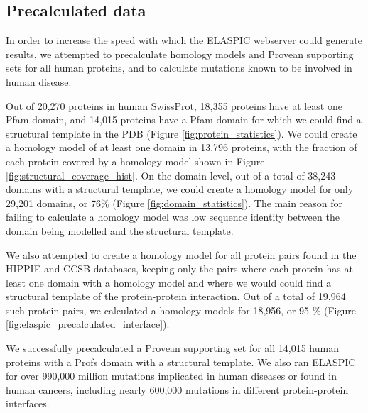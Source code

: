 \clearpage
\subsection{Precalculated data}

In order to increase the speed with which the ELASPIC webserver could generate results, we attempted to precalculate homology models and Provean supporting sets for all human proteins, and to calculate mutations known to be involved in human disease.

Out of 20,270 proteins in human SwissProt, 18,355 proteins have at least one Pfam domain, and 14,015 proteins have a Pfam domain for which we could find a structural template in the PDB (Figure \ref{fig:protein_statistics}). We could create a homology model of at least one domain in 13,796 proteins, with the fraction of each protein covered by a homology model shown in Figure \ref{fig:structural_coverage_hist}. On the domain level, out of a total of 38,243 domains with a structural template, we could create a homology model for only 29,201 domains, or 76\% (Figure \ref{fig:domain_statistics}). The main reason for failing to calculate a homology model was low sequence identity between the domain being modelled and the structural template.

We also attempted to create a homology model for all protein pairs found in the HIPPIE \cite{schaefer_hippie:_2012} and CCSB \cite{rolland_proteome-scale_2014} databases, keeping only the pairs where each protein has at least one domain with a homology model and where we would could find a structural template of the protein-protein interaction. Out of a total of 19,964 such protein pairs, we calculated a homology models for 18,956, or 95 \% (Figure \ref{fig:elaspic_precalculated_interface}).

We successfully precalculated a Provean supporting set for all 14,015 human proteins with a Profs domain with a structural template. We also ran ELASPIC for over 990,000 million mutations implicated in human diseases or found in human cancers, including nearly 600,000 mutations in different protein-protein interfaces.


